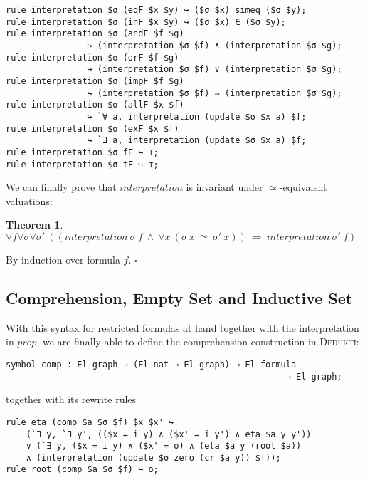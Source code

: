 \documentclass[submission,copyright,creativecommons]{eptcs}
\def\imp{\mathbin{\Rightarrow}}
\def\fa{{\forall}}
\def\conj{\mathbin{\wedge}}
\newtheorem{theorem}{Theorem}[section]
\newenvironment{proof}{\noindent {\em Proof.}}{\medskip}
\newcommand{\dedukti}{\textsc{Dedukti}}
\begin{document}
\begin{lstlisting}
rule interpretation $σ (eqF $x $y) ↪ ($σ $x) simeq ($σ $y);
rule interpretation $σ (inF $x $y) ↪ ($σ $x) ∈ ($σ $y);
rule interpretation $σ (andF $f $g)
                ↪ (interpretation $σ $f) ∧ (interpretation $σ $g);
rule interpretation $σ (orF $f $g)
                ↪ (interpretation $σ $f) ∨ (interpretation $σ $g);
rule interpretation $σ (impF $f $g)
                ↪ (interpretation $σ $f) ⇒ (interpretation $σ $g);
rule interpretation $σ (allF $x $f)
                ↪ `∀ a, interpretation (update $σ $x a) $f;
rule interpretation $σ (exF $x $f)
                ↪ `∃ a, interpretation (update $σ $x a) $f;
rule interpretation $σ fF ↪ ⊥;
rule interpretation $σ tF ↪ ⊤;
\end{lstlisting}

We can finally prove that $interpretation$ is invariant under $\simeq$-equivalent valuations:

\begin{theorem}
$\fa f \fa \sigma \fa \sigma' ~((interpretation \ \sigma \ f \ \conj \ \fa x ~(\sigma \ x \ \simeq \ \sigma' \ x)) \ \imp \ interpretation \ \sigma' \ f)$
\end{theorem}
\begin{proof}
By induction over formula $f$. $\square$
\end{proof}

\subsection{Comprehension, Empty Set and Inductive Set}

With this syntax for restricted formulas at hand together with the interpretation in $prop$, we are finally able to define the comprehension construction in \dedukti:

\begin{lstlisting}
symbol comp : El graph → (El nat → El graph) → El formula
                                                       → El graph;
\end{lstlisting}

together with its rewrite rules

\begin{lstlisting}
rule eta (comp $a $σ $f) $x $x' ↪ 
	(`∃ y, `∃ y', (($x = i y) ∧ ($x' = i y') ∧ eta $a y y')) 
	∨ (`∃ y, ($x = i y) ∧ ($x' = o) ∧ (eta $a y (root $a))
	∧ (interpretation (update $σ zero (cr $a y)) $f));
rule root (comp $a $σ $f) ↪ o;
\end{lstlisting}
\end{document}
